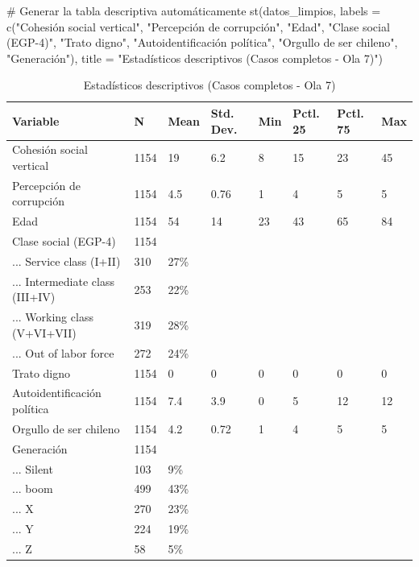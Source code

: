 \documentclass[
  spanish,
  a4paper,
  oneside]{scrbook}
\newenvironment{Shaded}{\begin{snugshade}}{\end{snugshade}}
\newcommand{\AttributeTok}[1]{\textcolor[rgb]{0.40,0.45,0.13}{#1}}
\newcommand{\CommentTok}[1]{\textcolor[rgb]{0.37,0.37,0.37}{#1}}
\newcommand{\FunctionTok}[1]{\textcolor[rgb]{0.28,0.35,0.67}{#1}}
\newcommand{\NormalTok}[1]{\textcolor[rgb]{0.00,0.23,0.31}{#1}}
\newcommand{\StringTok}[1]{\textcolor[rgb]{0.13,0.47,0.30}{#1}}
\begin{document}
\begin{Shaded}
\begin{Highlighting}[]
\CommentTok{\# Generar la tabla descriptiva automáticamente}
\FunctionTok{st}\NormalTok{(datos\_limpios, }
   \AttributeTok{labels =} \FunctionTok{c}\NormalTok{(}\StringTok{"Cohesión social vertical"}\NormalTok{, }\StringTok{"Percepción de corrupción"}\NormalTok{, }\StringTok{"Edad"}\NormalTok{, }
              \StringTok{"Clase social (EGP{-}4)"}\NormalTok{, }\StringTok{"Trato digno"}\NormalTok{, }\StringTok{"Autoidentificación política"}\NormalTok{, }
              \StringTok{"Orgullo de ser chileno"}\NormalTok{, }\StringTok{"Generación"}\NormalTok{),}
   \AttributeTok{title =} \StringTok{"Estadísticos descriptivos (Casos completos {-} Ola 7)"}\NormalTok{)}
\end{Highlighting}
\end{Shaded}

\begin{table}

\caption{\label{tab:unnamed-chunk-2}Estadísticos descriptivos (Casos completos - Ola 7)}
\centering
\begin{tabular}[t]{llllllll}
\toprule
Variable & N & Mean & Std. Dev. & Min & Pctl. 25 & Pctl. 75 & Max\\
\midrule
Cohesión social vertical & 1154 & 19 & 6.2 & 8 & 15 & 23 & 45\\
Percepción de corrupción & 1154 & 4.5 & 0.76 & 1 & 4 & 5 & 5\\
Edad & 1154 & 54 & 14 & 23 & 43 & 65 & 84\\
Clase social (EGP-4) & 1154 &  &  &  &  &  & \\
... Service class (I+II) & 310 & 27\% &  &  &  &  & \\
\addlinespace
... Intermediate class (III+IV) & 253 & 22\% &  &  &  &  & \\
... Working class (V+VI+VII) & 319 & 28\% &  &  &  &  & \\
... Out of labor force & 272 & 24\% &  &  &  &  & \\
Trato digno & 1154 & 0 & 0 & 0 & 0 & 0 & 0\\
Autoidentificación política & 1154 & 7.4 & 3.9 & 0 & 5 & 12 & 12\\
\addlinespace
Orgullo de ser chileno & 1154 & 4.2 & 0.72 & 1 & 4 & 5 & 5\\
Generación & 1154 &  &  &  &  &  & \\
... Silent & 103 & 9\% &  &  &  &  & \\
... boom & 499 & 43\% &  &  &  &  & \\
... X & 270 & 23\% &  &  &  &  & \\
\addlinespace
... Y & 224 & 19\% &  &  &  &  & \\
... Z & 58 & 5\% &  &  &  &  & \\
\bottomrule
\end{tabular}
\end{table}
\end{document}
